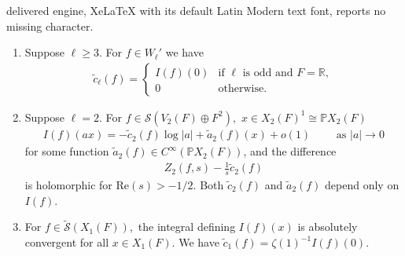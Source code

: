 \documentclass[10pt,a4paper]{amsart}
\newcommand{\RR}{\mathbb{R}}
\begin{document}
delivered engine, XeLaTeX with its default Latin Modern text font, reports no missing character.
\begin{lem}\label{lem:easy:arch}
\begin{enumerate}[label=(\roman*)]
    \item  Suppose $\ell\ge 3$. For $f\in W_\ell'$ we have
    \begin{align*}
        \tilde{c}_\ell(f)=\begin{cases}
            I(f)(0) &\textrm{if } \ell \textrm{ is odd and }F=\RR,\\
            0 & \textrm{otherwise.}
        \end{cases}
    \end{align*}     
    \item Suppose $\ell=2$. For $f\in\mathcal{S}(V_2(F)\oplus F^2),$ $x\in X_{2}(F)^1\cong \mathbb{P}X_2(F)$ 
    \begin{align*} 
        I(f)(ax)=-\tilde{c}_2(f)\log|a|+\tilde{a}_2(f)(x)+o(1) \quad\quad \textrm{ as } |a|\to 0
    \end{align*}
    for some function $\tilde{a}_2(f)\in C^\infty(\mathbb{P}X_2(F))$, and the difference
    \begin{align*}
 Z_{2}(f,s)-\frac{1}{s}\tilde{c}_2(f)
    \end{align*}
    is holomorphic for $\mathrm{Re}(s)>-1/2$. Both $\tilde{c}_2(f)$ and $\tilde{a}_2(f)$ depend only on $I(f)$.
    \item For $f\in \widetilde{\mathcal{S}}(X_1(F)),$ the integral defining $I(f)(x)$ is absolutely convergent for all $x\in X_1(F)$. We have $\tilde{c}_1(f)=\zeta(1)^{-1}I(f)(0).$
\end{enumerate}

\end{lem}
\end{document}
